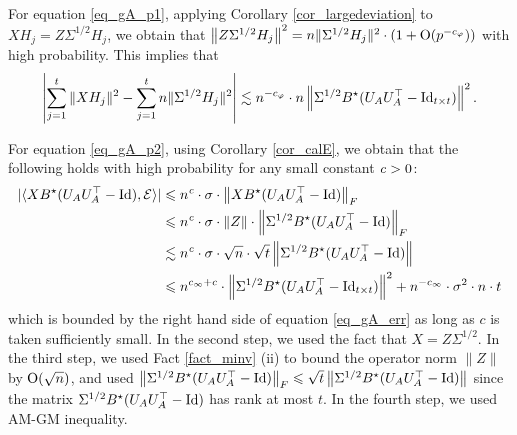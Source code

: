 	For equation \eqref{eq_gA_p1}, %
	applying Corollary \ref{cor_largedeviation} to $X H_j = Z \Sigma^{1/2} H_j$, we obtain that 
	${\left\|Z \Sigma^{1/2} H_j \right\|^2 } = { n \|\Sigma^{1/2} H_j\|^2} \cdot (1 + \operatorname{O}(p^{-c_\varphi}))$ with high probability. 
	This implies that
	\begin{align}
		\left\lvert\sum_{j=1}^t \|X H_j\|^2 -  \sum_{j=1}^t n\|\Sigma^{1/2} H_j\|^2\right\rvert \lesssim   n^{-c_{\varphi}} \cdot n  \left\| \Sigma^{1/2} B^{\star} (U_{A}U_A^{\top} - \operatorname{Id}_{t\times t}) \right\|^2. \label{eq_gA_err1}
	\end{align}

	For equation \eqref{eq_gA_p2}, 
	using Corollary \ref{cor_calE}, we obtain that the following holds with high probability for any small constant ${\mathit{c}}>0$:
	\begin{align}
		|\langle XB^{\star} (U_AU_A^{\top} - \operatorname{Id}), \mathcal{E} \rangle| &\leqslant n^{\mathit{c}} \cdot \sigma \cdot \left\| XB^{\star} (U_AU_A^{\top} - \operatorname{Id}) \right\|_{F} \nonumber \\
		&\leqslant n^{{\mathit{c}}} \cdot \sigma \cdot \|Z\| \cdot \left\| \Sigma^{1/2} B^{\star}(U_AU_A^{\top} -\operatorname{Id}) \right\|_{F} \nonumber \\
		&\lesssim n^{{\mathit{c}}} \cdot \sigma \cdot \sqrt{n}\cdot \sqrt{t}\left\| \Sigma^{1/2} B^{\star}(U_AU_A^{\top} -\operatorname{Id}) \right\| \nonumber \\
		&\leqslant  n^{c_\infty +c} \cdot \left\| \Sigma^{1/2} B^{\star} (U_AU_A^{\top} - \operatorname{Id}_{t\times t}) \right\|^2 + n^{-c_{\infty}} \cdot \sigma^2 \cdot n \cdot t
		\label{eq_gA_err2}
	\end{align}
	which is bounded by the right hand side of equation \eqref{eq_gA_err} as long as $c$ is taken sufficiently small.
	In the second step, we used the fact that $X=Z\Sigma^{1/2}$.
	In the third step, we used Fact \ref{fact_minv} (ii) to bound the operator norm $\|Z\|$ by $\operatorname{O}(\sqrt{n})$, and used $\left\| \Sigma^{1/2} B^{\star}(U_AU_A^{\top} -\operatorname{Id}) \right\|_{F}\leqslant \sqrt{t} \left\| \Sigma^{1/2} B^{\star}(U_AU_A^{\top} -\operatorname{Id}) \right\|$ since the matrix $\Sigma^{1/2} B^{\star}(U_AU_A^{\top} -\operatorname{Id})$ has rank at most $t$. In the fourth step, we used AM-GM inequality.

